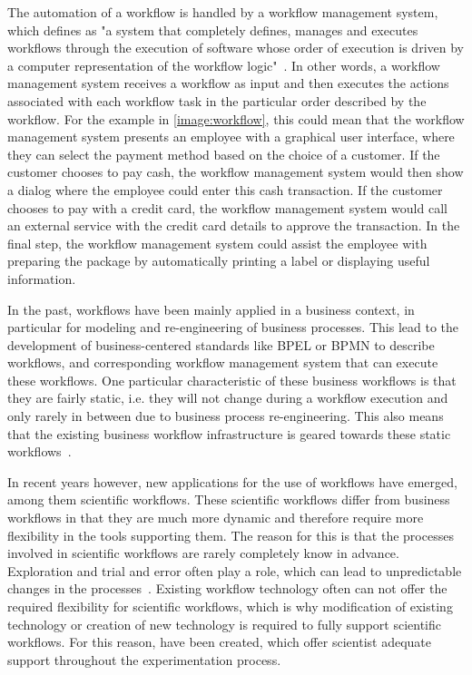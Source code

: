 The automation of a workflow is handled by a workflow management system, which \citeauthor*{workflow:referencemodel} defines as "a system that completely defines, manages and executes workflows through the execution of software whose order of execution is driven by a computer representation of the workflow logic"~\autocite{workflow:referencemodel}.
In other words, a workflow management system receives a workflow as input and then executes the actions associated with each workflow task in the particular order described by the workflow.
For the example in \autoref{image:workflow}, this could mean that the workflow management system presents an employee with a graphical user interface, where they can select the payment method based on the choice of a customer.
If the customer chooses to pay cash, the workflow management system would then show a dialog where the employee could enter this cash transaction.
If the customer chooses to pay with a credit card, the workflow management system would call an external service with the credit card details to approve the transaction.
In the final step, the workflow management system could assist the employee with preparing the package by automatically printing a label or displaying useful information.

In the past, workflows have been mainly applied in a business context, in particular for modeling and re-engineering of business processes.
This lead to the development of business-centered standards like BPEL or BPMN to describe workflows, and corresponding workflow management system that can execute these workflows.
One particular characteristic of these business workflows is that they are fairly static, i.e. they will not change during a workflow execution and only rarely in between due to business process re-engineering.
This also means that the existing business workflow infrastructure is geared towards these static workflows~\autocite{wasa}.

In recent years however, new applications for the use of workflows have emerged, among them scientific workflows.
These scientific workflows differ from business workflows in that they are much more dynamic and therefore require more flexibility in the tools supporting them.
The reason for this is that the processes involved in scientific workflows are rarely completely know in advance.
Exploration and trial and error often play a role, which can lead to unpredictable changes in the processes~\autocite{wasa}.
Existing workflow technology often can not offer the required flexibility for scientific workflows, which is why modification of existing technology or creation of new technology is required to fully support scientific workflows.
For this reason,  have been created, which offer scientist adequate support throughout the experimentation process.
